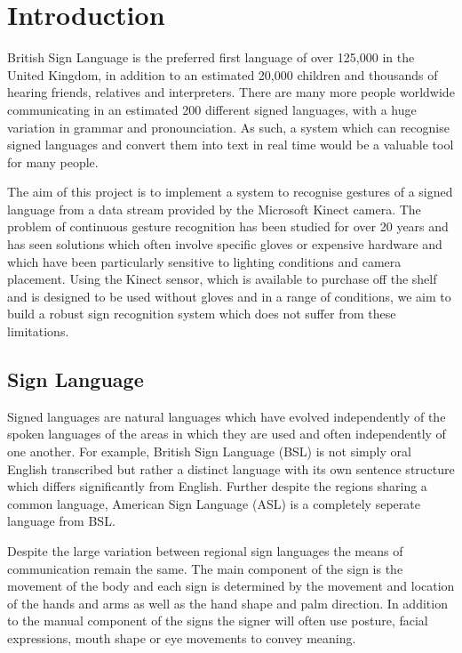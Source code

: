 \chapter{Introduction}
\ifpdf
    \graphicspath{{Introduction/IntroductionFigs/PNG/}{Introduction/IntroductionFigs/PDF/}{Introduction/IntroductionFigs/}}
\else
    \graphicspath{{Introduction/IntroductionFigs/EPS/}{Introduction/IntroductionFigs/}}
\fi

British Sign Language is the preferred first language of over 125,000 in the United Kingdom, in addition to an estimated 20,000 children and thousands of hearing friends, relatives and interpreters. There are many more people worldwide communicating in an estimated 200 different signed languages, with a huge variation in grammar and pronounciation. As such, a system which can recognise signed languages and convert them into text in real time would be a valuable tool for many people. 

The aim of this project is to implement a system to recognise gestures of a signed language from a data stream provided by the Microsoft Kinect camera. The problem of continuous gesture recognition has been studied for over 20 years and has seen solutions which often involve specific gloves or expensive hardware and which have been particularly sensitive to lighting conditions and camera placement. Using the Kinect sensor, which is available to purchase off the shelf and is designed to be used without gloves and in a range of conditions, we aim to build a robust sign recognition system which does not suffer from these limitations.

\section{Sign Language}
Signed languages are natural languages which have evolved independently of the spoken languages of the areas in which they are used and often independently of one another. For example, British Sign Language (BSL) is not simply oral English transcribed but rather a distinct language with its own sentence structure which differs significantly from English. Further despite the regions sharing a common language, American Sign Language (ASL) is a completely seperate language from BSL.

Despite the large variation between regional sign languages the means of communication remain the same. The main component of the sign is the movement of the body and each sign is determined by the movement and location of the hands and arms as well as the hand shape and palm direction. In addition to the manual component of the signs the signer will often use posture, facial expressions, mouth shape or eye movements to convey meaning.

